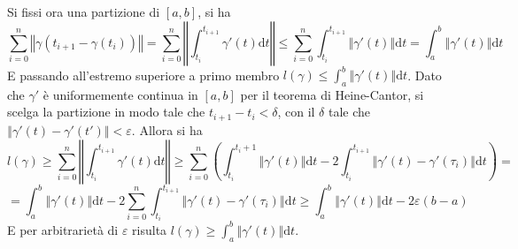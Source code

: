 \documentclass[a4paper,11pt]{article}
\newcommand{\norm}[1]{\left\Vert#1\right\Vert}
\begin{document}
\begin{enumerate}
	Si fissi ora una partizione di $[a,b]$, si ha
	\[\sum_{i=0}^{n}\norm{\gamma(t_{i+1}-\gamma(t_i))}=\sum_{i=0}^{n}\norm{\int_{t_i}^{t_{i+1}}\gamma'(t)\mathrm{d}t}\leq\sum_{i=0}^{n}\int_{t_i}^{t_{i+1}}\norm{\gamma'(t)}\mathrm{d}t=\int_{a}^{b}\norm{\gamma'(t)}\mathrm{d}t\]
	E passando all'estremo superiore a primo membro $l(\gamma)\leq\int_{a}^{b}\norm{\gamma'(t)}\mathrm{d}t$. Dato che $\gamma'$ è uniformemente continua in $[a,b]$ per il teorema di Heine-Cantor, si scelga la partizione in modo tale che $t_{i+1}-t_i<\delta$, con il $\delta$ tale che $\norm{\gamma'(t)-\gamma'(t')}<\varepsilon$. Allora si ha
	\[l(\gamma)\geq\sum_{i=0}^{n}\norm{\int_{t_i}^{t_{i+1}}\gamma'(t)\mathrm{d}t}\geq\sum_{i=0}^{n}\left(\int_{t_i}^{t_i+1}\norm{\gamma'(t)}\mathrm{d}t-2\int_{t_i}^{t_{i+1}}\norm{\gamma'(t)-\gamma'(\tau_i)}\mathrm{d}t\right)=\]
	\[=\int_{a}^{b}\norm{\gamma'(t)}\mathrm{d}t-2\sum_{i=0}^{n}\int_{t_i}^{t_{i+1}}\norm{\gamma'(t)-\gamma'(\tau_i)}\mathrm{d}t\geq\int_{a}^{b}\norm{\gamma'(t)}\mathrm{d}t-2\varepsilon(b-a)\]
	E per arbitrarietà di $\varepsilon$ risulta $l(\gamma)\geq\int_{a}^{b}\norm{\gamma'(t)}\mathrm{d}t$.
	

\end{enumerate}
\end{document}
